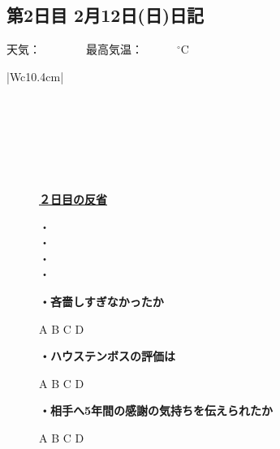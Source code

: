 \newpage

\subsection*{第2日目 2月12日(日)日記}
\vspace{0.5cm}
\centering
{}
\vspace{0.25cm}

\begin{rightline}
	{\scriptsize{天気：　　　　最高気温：　　　$ {}^\circ $C}}
\end{rightline}
\begin{table}[H]
	\centering
	\begin{tabular}{|Wc{10.4cm}|} \hline
		\\ \hline
		\\ \hline
		\\ \hline
		\\ \hline
		\\ \hline
		\\ \hline
		\\ \hline
	\end{tabular}
\end{table}

\begin{figure}[H]
	\begin{minipage}[b]{0.45\hsize}
		\begin{boxnote}
			\vspace{-0.2cm}
			\begin{center}
				\underline{\footnotesize{\textbf{２日目の反省}}}
			\end{center}
			\vspace{-0.4cm}
			
			\fontsize{12pt}{25pt}\selectfont
			・\\
			・\\
			・\\
			・
		\end{boxnote}
	\end{minipage}
	\hfill
	\begin{minipage}[b]{0.45\hsize}
		\begin{screen}
			\vspace{0.5cm}
			\scriptsize{\textbf{・吝嗇しすぎなかったか}}
			\begin{center}
				A \quad B \quad C \quad D
			\end{center}
			\scriptsize{\textbf{・ハウステンボスの評価は}}
			\begin{center}
				A \quad B \quad C \quad D
			\end{center}
			\tiny{\textbf{・相手へ5年間の感謝の気持ちを伝えられたか}}
			\begin{center}
				A \quad B \quad C \quad D
			\end{center}
			\vspace{0.05cm}
		\end{screen}
	\end{minipage}
\end{figure}


